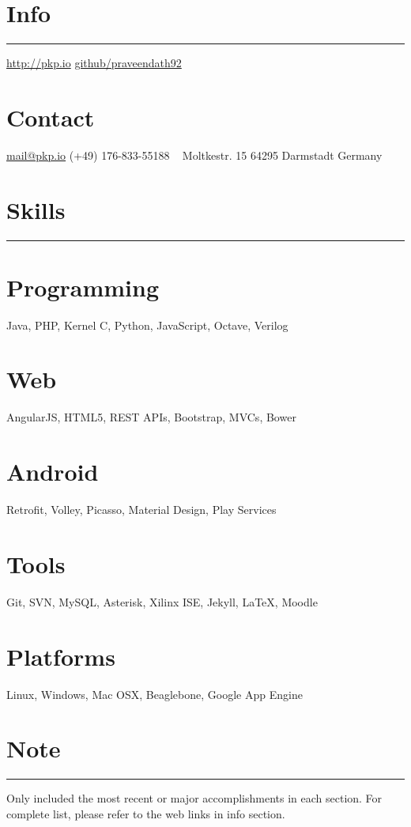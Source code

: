 \documentclass[]{friggeri-cv}
\begin{document}

\begin{aside}
  \section{Info}
    \noindent\rule{3cm}{0.5pt}
    \href{http://pkp.io}{http://pkp.io}
    \href{https://github.com/praveendath92}{github/praveendath92}    
  \section{Contact}
    \href{mailto:mail@pkp.io}{mail@pkp.io}
    (+49) 176-833-55188
    ~
    Moltkestr. 15
    64295 Darmstadt
    Germany
    ~
  \section{Skills}
    \noindent\rule{3cm}{0.5pt}
  \section{Programming}
    Java, PHP, Kernel C, Python, JavaScript, Octave, Verilog
  \section{Web}
    AngularJS, HTML5, REST APIs, Bootstrap, MVCs, Bower
  \section{Android}
    Retrofit, Volley, Picasso, Material Design, Play Services
  \section{Tools}
    Git, SVN, MySQL, Asterisk, Xilinx ISE, Jekyll, \LaTeX, Moodle
  \section{Platforms}
    Linux, Windows, Mac OSX, Beaglebone, Google App Engine
  \section{Note}
    \noindent\rule{3cm}{0.5pt}
    Only included the most recent or major accomplishments in each section. For complete list, please refer to the web links in info section.
\end{aside}
\end{document}
